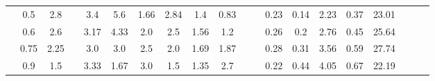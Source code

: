 \documentclass[a4paper,12pt]{article}
\begin{document}
\begin{table}[htbp]
\begin{tabular}{|c|c|c|c|c|c|c|c|c|c|c|c|c|c|c|c|c|c|c|c|}
			& 0.5        & 2.8        &                       & 3.4           & 5.6           & 1.66          & 2.84          & 1.4           & 0.83          &                       &                       & 0.23               & 0.14               & 2.23       & 0.37            & 23.01               &                       &                        &                      \\ \cline{2-3} \cline{5-10} \cline{13-17}
			& 0.6        & 2.6        &                       & 3.17          & 4.33          & 2.0           & 2.5           & 1.56          & 1.2           &                       &                       & 0.26               & 0.2                & 2.76       & 0.45            & 25.64               &                       &                        &                      \\ \cline{2-3} \cline{5-10} \cline{13-17}
			& 0.75       & 2.25       &                       & 3.0           & 3.0           & 2.5           & 2.0           & 1.69          & 1.87          &                       &                       & 0.28               & 0.31               & 3.56       & 0.59            & 27.74               &                       &                        &                      \\ \cline{2-3} \cline{5-10} \cline{13-17}
			& 0.9        & 1.5        &                       & 3.33          & 1.67          & 3.0           & 1.5           & 1.35          & 2.7           &                       &                       & 0.22               & 0.44               & 4.05       & 0.67            & 22.19               &                       &                        &                      \\ \hline
		\end{tabular}%
	\end{table}
	
\end{document}
